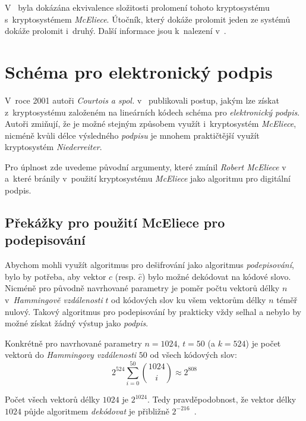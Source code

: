 \documentclass[thesis=M,czech,hidelinks]{FITthesis}[2012/06/26]
\newcommand{\0}{{\textcolor[gray]{0.75}{0}}}
\begin{document}
V~\cite{XingLi} byla dokázána ekvivalence složitosti prolomení tohoto
kryptosystému s~kryptosystémem \emph{McEliece}. Útočník, který dokáže prolomit
jeden ze systémů dokáže prolomit i~druhý. Další informace jsou k~nalezení
v~\cite{Niederreiter,Courtois}.



\section{Schéma pro elektronický podpis}\label{kap_schema_pro_podpis}


V~roce 2001 autoři \emph{Courtois a spol.} v~\cite{Courtois} publikovali postup,
jakým lze získat z~kryptosystému založeném na lineárních kódech schéma pro
\emph{elektronický podpis}. Autoři zmiňují, že je možné stejným způsobem využít
i~kryptosystém \emph{McEliece}, nicméně kvůli délce výsledného \emph{podpisu} je
mnohem praktičtější využít kryptosystém \emph{Niederreiter}.


Pro úplnost zde uvedeme původní argumenty, které zmínil \emph{Robert
McEliece} v~\cite{McEliece} a~které bránily v~použití kryptosystému
\emph{McEliece} jako algoritmu pro digitální podpis.


\subsection{Překážky pro použití McEliece pro podepisování}

Abychom mohli využít algoritmus pro dešifrování jako algoritmus
\emph{podepisování}, bylo by potřeba, aby vektor $c$ (resp. $\hat{c}$) bylo
možné dekódovat na kódové slovo. Nicméně pro původně navrhované parametry je
poměr počtu vektorů délky $n$ v~\emph{Hammingově vzdálenosti} $t$ od kódových
slov ku všem vektorům délky $n$ téměř nulový. Takový algoritmus pro podepisování
by prakticky vždy selhal a nebylo by možné získat žádný výstup jako
\emph{podpis}.

Konkrétně pro navrhované parametry $n=1024$, $t=50$ (a $k=524$) je počet vektorů
do \emph{Hammingovy vzdálenosti} $50$ od všech kódových slov:
$$ 2^{524}\sum_{i = 0}^{50}\binom{1024}{i} \approx 2^{808} $$

\newpage

Počet všech vektorů délky $1024$ je $2^{1024}$. Tedy pravděpodobnost, že vektor
délky $1024$ půjde algoritmem \emph{dekódovat} je přibližně
$2^{-216}$~\cite{McEliece}.
\end{document}
